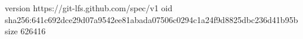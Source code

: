 version https://git-lfs.github.com/spec/v1
oid sha256:641c692dce29d07a9542ee81abada07506c0294c1a24f9d8825dbc236d41b95b
size 626416
